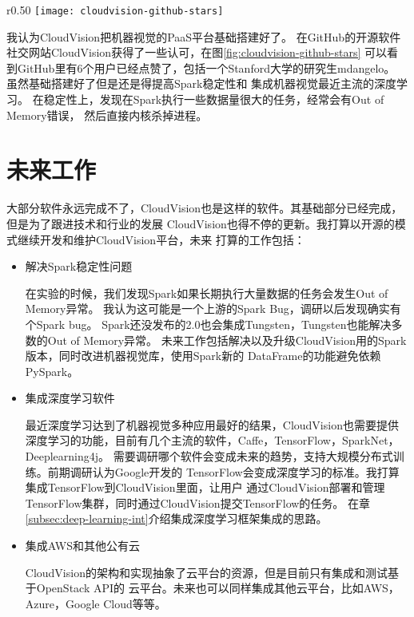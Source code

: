 \begin{wrapfigure}{r}{0.50\textwidth}
  \centering
    \texttt{[image: cloudvision-github-stars]}
    \caption{CloudVision在GitHub获得的认可}
  \label{fig:cloudvision-github-stars}
\end{wrapfigure}
我认为CloudVision把机器视觉的PaaS平台基础搭建好了。
在GitHub的开源软件社交网站CloudVision获得了一些认可，在图\ref{fig:cloudvision-github-stars}
可以看到GitHub里有6个用户已经点赞了，包括一个Stanford大学的研究生mdangelo。
虽然基础搭建好了但是还是得提高Spark稳定性和
集成机器视觉最近主流的深度学习。
在稳定性上，发现在Spark执行一些数据量很大的任务，经常会有Out of Memory错误，
然后直接内核杀掉进程。


\section{未来工作}
大部分软件永远完成不了，CloudVision也是这样的软件。其基础部分已经完成，但是为了跟进技术和行业的发展
CloudVision也得不停的更新。我打算以开源的模式继续开发和维护CloudVision平台，未来
打算的工作包括：
\begin{itemize}
  \item 解决Spark稳定性问题

        在实验的时候，我们发现Spark如果长期执行大量数据的任务会发生Out of Memory异常。
        我认为这可能是一个上游的Spark Bug，调研以后发现确实有个Spark bug。\cite{spark-oom-bug}
        Spark还没发布的2.0也会集成Tungsten，Tungsten也能解决多数的Out of Memory异常。
        未来工作包括解决以及升级CloudVision用的Spark版本，同时改进机器视觉库，使用Spark新的
        DataFrame的功能避免依赖PySpark。

  \item 集成深度学习软件

        最近深度学习达到了机器视觉多种应用最好的结果，CloudVision也需要提供
        深度学习的功能，目前有几个主流的软件，Caffe，TensorFlow，SparkNet，Deeplearning4j。
        需要调研哪个软件会变成未来的趋势，支持大规模分布式训练。前期调研认为Google开发的
        TensorFlow会变成深度学习的标准。我打算集成TensorFlow到CloudVision里面，让用户
        通过CloudVision部署和管理TensorFlow集群，同时通过CloudVision提交TensorFlow的任务。
        在章\ref{subsec:deep-learning-int}介绍集成深度学习框架集成的思路。

  \item 集成AWS和其他公有云

        CloudVision的架构和实现抽象了云平台的资源，但是目前只有集成和测试基于OpenStack API的
        云平台。未来也可以同样集成其他云平台，比如AWS，Azure，Google Cloud等等。

\end{itemize}


